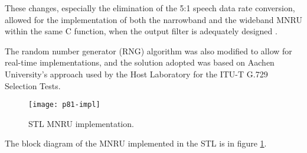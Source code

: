 These changes, especially the elimination of the 5:1 speech data rate
conversion, allowed for the implementation of both the narrowband and
the wideband MNRU within the same C function, when the output filter is
adequately designed \cite[pp.7--12]{Duo-MNRU}.

The random number generator (RNG) algorithm was also modified to allow
for real-time implementations, and the solution adopted was based on
Aachen University's approach used by the Host Laboratory for the ITU-T
G.729 Selection Tests.

\begin{figure}[ht]
  \begin{center}
    \texttt{[image: p81-impl]}
  \end{center}
   \caption{STL MNRU implementation.\label{STL96-MNRU}}
\end{figure}

The block diagram of the MNRU implemented in the STL is in
figure \ref{STL96-MNRU}.

